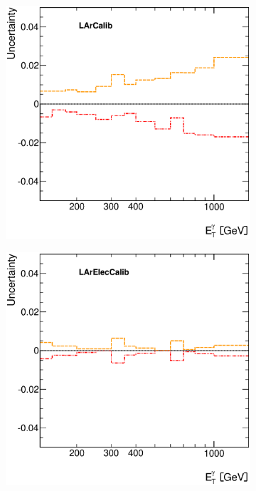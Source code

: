 \documentclass[12pt, twoside]{article}
\numberwithin{equation}{section}
\numberwithin{figure}{section}
\newenvironment{changemargin}[2]{%
\begin{list}{}{%
\setlength{\topsep}{0pt}%
\setlength{\leftmargin}{#1}%
\setlength{\rightmargin}{#2}%
\setlength{\listparindent}{\parindent}%
\setlength{\itemindent}{\parindent}%
\setlength{\parsep}{\parskip}%
}%
\item[]}{\end{list}}
\begin{document}
\begin{figure}[H]
\begin{changemargin}{-1.0cm}{-0.75cm}
\begin{changemargin}{-0.75cm}{-1.0cm}
\begin{subfigure}[b]{0.27\textwidth}
        \end{subfigure}
        \begin{subfigure}[b]{0.27\textwidth}
            \includegraphics[width=\textwidth]{./images/PhotonSystematics/PhotonSystematic-7.eps}
        \end{subfigure}
        \begin{subfigure}[b]{0.27\textwidth}
            \includegraphics[width=\textwidth]{./images/PhotonSystematics/PhotonSystematic-8.eps}
        \end{subfigure}


\end{changemargin}
\end{changemargin}
\end{figure}
\end{document}
